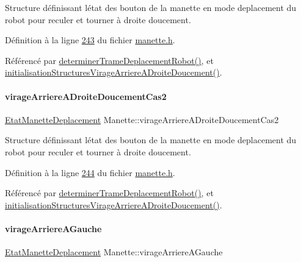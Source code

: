 Structure définissant l\textquotesingle{}état des bouton de la manette en mode deplacement du robot pour reculer et tourner à droite doucement. 



Définition à la ligne \hyperlink{manette_8h_source_l00243}{243} du fichier \hyperlink{manette_8h_source}{manette.\+h}.



Référencé par \hyperlink{manette_8cpp_source_l00341}{determiner\+Trame\+Deplacement\+Robot()}, et \hyperlink{manette_8cpp_source_l00296}{initialisation\+Structures\+Virage\+Arriere\+A\+Droite\+Doucement()}.

\mbox{\label{class_manette_a609f10f48e39eafac800eb232272f0cb}} 
\paragraph{\texorpdfstring{virage\+Arriere\+A\+Droite\+Doucement\+Cas2}{virageArriereADroiteDoucementCas2}}
{\footnotesize\ttfamily \hyperlink{struct_etat_manette_deplacement}{Etat\+Manette\+Deplacement} Manette\+::virage\+Arriere\+A\+Droite\+Doucement\+Cas2\hspace{0.3cm}{\ttfamily [private]}}



Structure définissant l\textquotesingle{}état des bouton de la manette en mode deplacement du robot pour reculer et tourner à droite doucement. 



Définition à la ligne \hyperlink{manette_8h_source_l00244}{244} du fichier \hyperlink{manette_8h_source}{manette.\+h}.



Référencé par \hyperlink{manette_8cpp_source_l00341}{determiner\+Trame\+Deplacement\+Robot()}, et \hyperlink{manette_8cpp_source_l00296}{initialisation\+Structures\+Virage\+Arriere\+A\+Droite\+Doucement()}.

\mbox{\label{class_manette_a92a64ea372e58825097e049694e838a1}} 
\paragraph{\texorpdfstring{virage\+Arriere\+A\+Gauche}{virageArriereAGauche}}
{\footnotesize\ttfamily \hyperlink{struct_etat_manette_deplacement}{Etat\+Manette\+Deplacement} Manette\+::virage\+Arriere\+A\+Gauche\hspace{0.3cm}{\ttfamily [private]}}



